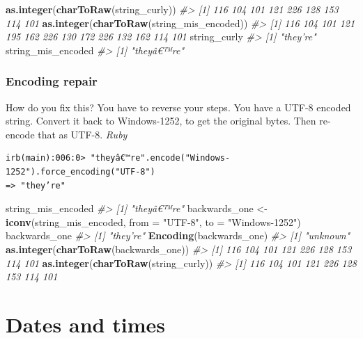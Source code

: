 \documentclass[
]{book}
\newenvironment{Shaded}{\begin{snugshade}}{\end{snugshade}}
\newcommand{\CommentTok}[1]{\textcolor[rgb]{0.56,0.35,0.01}{\textit{#1}}}
\newcommand{\DataTypeTok}[1]{\textcolor[rgb]{0.13,0.29,0.53}{#1}}
\newcommand{\KeywordTok}[1]{\textcolor[rgb]{0.13,0.29,0.53}{\textbf{#1}}}
\newcommand{\NormalTok}[1]{#1}
\newcommand{\StringTok}[1]{\textcolor[rgb]{0.31,0.60,0.02}{#1}}
\begin{document}
\begin{Shaded}
\begin{Highlighting}[]
\KeywordTok{as.integer}\NormalTok{(}\KeywordTok{charToRaw}\NormalTok{(string_curly))}
\CommentTok{#> [1] 116 104 101 121 226 128 153 114 101}
\KeywordTok{as.integer}\NormalTok{(}\KeywordTok{charToRaw}\NormalTok{(string_mis_encoded))}
\CommentTok{#>  [1] 116 104 101 121 195 162 226 130 172 226 132 162 114 101}
\NormalTok{string_curly}
\CommentTok{#> [1] "they’re"}
\NormalTok{string_mis_encoded}
\CommentTok{#> [1] "theyâ€™re"}
\end{Highlighting}
\end{Shaded}

\hypertarget{encoding-repair}{%
\subsection{Encoding repair}\label{encoding-repair}}

How do you fix this? You have to reverse your steps. You have a UTF-8 encoded string. Convert it back to Windows-1252, to get the original bytes. Then re-encode that as UTF-8. \emph{Ruby}

\begin{verbatim}
irb(main):006:0> "theyâ€™re".encode("Windows-1252").force_encoding("UTF-8")
=> "they’re"
\end{verbatim}

\begin{Shaded}
\begin{Highlighting}[]
\NormalTok{string_mis_encoded}
\CommentTok{#> [1] "theyâ€™re"}
\NormalTok{backwards_one <-}\StringTok{ }\KeywordTok{iconv}\NormalTok{(string_mis_encoded, }\DataTypeTok{from =} \StringTok{"UTF-8"}\NormalTok{, }\DataTypeTok{to =} \StringTok{"Windows-1252"}\NormalTok{)}
\NormalTok{backwards_one}
\CommentTok{#> [1] "they’re"}
\KeywordTok{Encoding}\NormalTok{(backwards_one)}
\CommentTok{#> [1] "unknown"}
\KeywordTok{as.integer}\NormalTok{(}\KeywordTok{charToRaw}\NormalTok{(backwards_one))}
\CommentTok{#> [1] 116 104 101 121 226 128 153 114 101}
\KeywordTok{as.integer}\NormalTok{(}\KeywordTok{charToRaw}\NormalTok{(string_curly))}
\CommentTok{#> [1] 116 104 101 121 226 128 153 114 101}
\end{Highlighting}
\end{Shaded}

\hypertarget{date-time}{%
\chapter{Dates and times}\label{date-time}}
\end{document}
